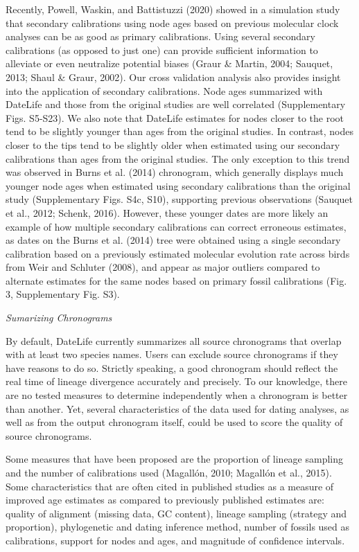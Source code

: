 \documentclass[english,man]{apa6}
\begin{document}
Recently, Powell, Waskin, and Battistuzzi (2020) showed in a simulation study that secondary calibrations using node ages based on previous molecular clock analyses can be as good as primary calibrations.
Using several secondary calibrations (as opposed to just one) can provide sufficient information to alleviate or even neutralize potential biases (Graur \& Martin, 2004; Sauquet, 2013; Shaul \& Graur, 2002). Our cross validation analysis also provides insight into the application of secondary calibrations. Node ages summarized with DateLife and those from the original studies are well correlated (Supplementary Figs. S5-S23). We also note that DateLife estimates for nodes closer to the root tend to be slightly younger than ages from the original studies. In contrast, nodes closer to the tips tend to be slightly older when estimated using our secondary calibrations than ages from the original studies. The only exception to this trend was observed in Burns et al. (2014) chronogram, which generally displays much younger node ages when estimated using secondary calibrations than the original study (Supplementary Figs. S4c, S10), supporting previous observations (Sauquet et al., 2012; Schenk, 2016). However, these younger dates are more likely an example of how multiple secondary calibrations can correct erroneous estimates, as dates on the Burns et al. (2014) tree were obtained using a single secondary calibration based on a previously estimated molecular evolution rate across birds from Weir and Schluter (2008), and appear as major outliers compared to alternate estimates for the same nodes based on primary fossil calibrations (Fig. 3, Supplementary Fig. S3).

\begin{center}
\emph{Sumarizing Chronograms}
\end{center}

By default, DateLife currently summarizes all source chronograms that overlap with at least two species names. Users can exclude source chronograms if they have reasons to do so.
Strictly speaking, a good chronogram should reflect the real time of lineage divergence accurately and precisely.
To our knowledge, there are no tested measures to determine independently when a chronogram is better than another. Yet, several characteristics of the data used for dating analyses, as well as from the output chronogram itself, could be used to score the quality of source chronograms.

Some measures that have been proposed are the proportion of lineage sampling and the number of calibrations used (Magallón, 2010; Magallón et al., 2015).
Some characteristics that are often cited in published studies as a measure of improved age estimates as compared to previously published estimates are: quality of alignment (missing data, GC content), lineage sampling (strategy and proportion), phylogenetic and dating inference method, number of fossils used as calibrations, support for nodes and ages, and magnitude of confidence intervals.
\end{document}
